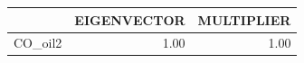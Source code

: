 \begin{tabular}{rrr}
  \hline
 & EIGENVECTOR & MULTIPLIER \\ 
  \hline
CO\_oil2 & 1.00 & 1.00 \\ 
   \hline
\end{tabular}
